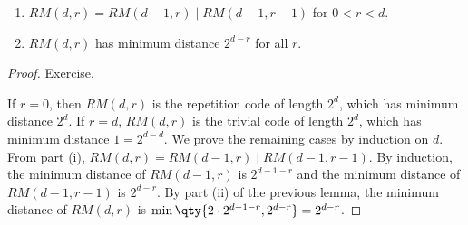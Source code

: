 \begin{theorem}
    \begin{enumerate}
        \item $RM(d,r) = RM(d-1,r) \mid RM(d-1,r-1)$ for $0 < r < d$.
        \item $RM(d,r)$ has minimum distance $2^{d-r}$ for all $r$.
    \end{enumerate}
\end{theorem}
\begin{proof}
    Exercise.

    If $r = 0$, then $RM(d,r)$ is the repetition code of length $2^d$, which has minimum distance $2^d$.
    If $r = d$, $RM(d,r)$ is the trivial code of length $2^d$, which has minimum distance $1 = 2^{d-d}$.
    We prove the remaining cases by induction on $d$.
    From part (i), $RM(d,r) = RM(d-1,r) \mid RM(d-1,r-1)$.
    By induction, the minimum distance of $RM(d-1,r)$ is $2^{d-1-r}$ and the minimum distance of $RM(d-1,r-1)$ is $2^{d-r}$.
    By part (ii) of the previous lemma, the minimum distance of $RM(d,r)$ is $\min\qty{2\cdot 2^{d-1-r}, 2^{d-r}} = 2^{d-r}$.
\end{proof}

